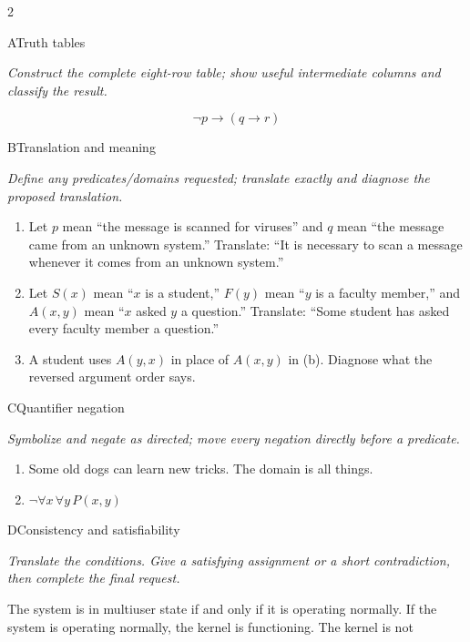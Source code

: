 \documentclass[9pt]{extarticle}
\begin{document}
\CoreWorkArea
\FormBreak
{}
\begin{multicols}{2}
\begin{CoreProblem}{A}{Truth tables}
{\scriptsize\textit{Construct the complete eight-row table; show useful intermediate columns and classify the result.}\par}
\[
  \neg p\to(q\to r)
\]
\end{CoreProblem}
\begin{CoreProblem}{B}{Translation and meaning}
{\scriptsize\textit{Define any predicates/domains requested; translate exactly and diagnose the proposed translation.}\par}
\begin{enumerate}[label=(\alph*)]
  \item Let $p$ mean ``the message is scanned for viruses'' and $q$ mean ``the
        message came from an unknown system.'' Translate: ``It is necessary to
        scan a message whenever it comes from an unknown system.''
  \item Let $S(x)$ mean ``$x$ is a student,'' $F(y)$ mean ``$y$ is a faculty
        member,'' and $A(x,y)$ mean ``$x$ asked $y$ a question.'' Translate:
        ``Some student has asked every faculty member a question.''
  \item A student uses $A(y,x)$ in place of $A(x,y)$ in (b). Diagnose what the
        reversed argument order says.
\end{enumerate}
\end{CoreProblem}
\begin{CoreProblem}{C}{Quantifier negation}
{\scriptsize\textit{Symbolize and negate as directed; move every negation directly before a predicate.}\par}
\begin{enumerate}[label=(\alph*)]
  \item Some old dogs can learn new tricks. The domain is all things.
  \item $\neg\forall x\,\forall y\,P(x,y)$
\end{enumerate}
\end{CoreProblem}
\columnbreak
\begin{CoreProblem}{D}{Consistency and satisfiability}
{\scriptsize\textit{Translate the conditions. Give a satisfying assignment or a short contradiction, then complete the final request.}\par}
The system is in multiuser state if and only if it is operating normally. If
the system is operating normally, the kernel is functioning. The kernel is not

\end{CoreProblem}
\end{multicols}
\end{document}
